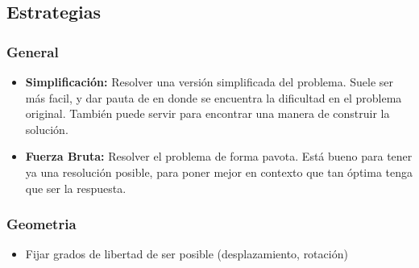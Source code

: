 \subsection{Estrategias}

\subsubsection*{General}
\begin{itemize}
    \item \textbf{Simplificación:} Resolver una versión simplificada del problema. Suele ser más facil, y dar pauta de en donde se encuentra la dificultad en el problema original. También puede servir para encontrar una manera de construir la solución.
    \item \textbf{Fuerza Bruta:} Resolver el problema de forma pavota. Está bueno para tener ya una resolución posible, para poner mejor en contexto que tan óptima tenga que ser la respuesta.
\end{itemize}

\subsubsection*{Geometria}
\begin{itemize}
    \item Fijar grados de libertad de ser posible (desplazamiento, rotación)
\end{itemize}
